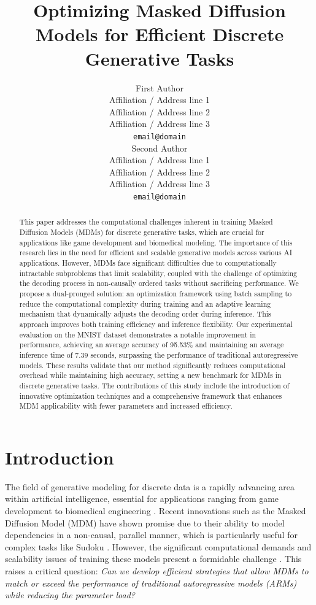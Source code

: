 \documentclass[11pt]{article}
\title{Optimizing Masked Diffusion Models for Efficient Discrete Generative Tasks}
\author{First Author \\
  Affiliation / Address line 1 \\
  Affiliation / Address line 2 \\
  Affiliation / Address line 3 \\
  \texttt{email@domain} \\\And
  Second Author \\
  Affiliation / Address line 1 \\
  Affiliation / Address line 2 \\
  Affiliation / Address line 3 \\
  \texttt{email@domain} \\}
\begin{document}
\maketitle
\begin{abstract}
This paper addresses the computational challenges inherent in training Masked Diffusion Models (MDMs) for discrete generative tasks, which are crucial for applications like game development and biomedical modeling. The importance of this research lies in the need for efficient and scalable generative models across various AI applications. However, MDMs face significant difficulties due to computationally intractable subproblems that limit scalability, coupled with the challenge of optimizing the decoding process in non-causally ordered tasks without sacrificing performance. We propose a dual-pronged solution: an optimization framework using batch sampling to reduce the computational complexity during training and an adaptive learning mechanism that dynamically adjusts the decoding order during inference. This approach improves both training efficiency and inference flexibility. Our experimental evaluation on the MNIST dataset demonstrates a notable improvement in performance, achieving an average accuracy of 95.53\% and maintaining an average inference time of 7.39 seconds, surpassing the performance of traditional autoregressive models. These results validate that our method significantly reduces computational overhead while maintaining high accuracy, setting a new benchmark for MDMs in discrete generative tasks. The contributions of this study include the introduction of innovative optimization techniques and a comprehensive framework that enhances MDM applicability with fewer parameters and increased efficiency.
\end{abstract}


\section{Introduction}

The field of generative modeling for discrete data is a rapidly advancing area within artificial intelligence, essential for applications ranging from game development to biomedical engineering \cite{genmol2025,adaptive2025}. Recent innovations such as the Masked Diffusion Model (MDM) have shown promise due to their ability to model dependencies in a non-causal, parallel manner, which is particularly useful for complex tasks like Sudoku \cite{masked2024,maskmamba2024}. However, the significant computational demands and scalability issues of training these models present a formidable challenge \cite{simplified2024}. This raises a critical question: \textit{Can we develop efficient strategies that allow MDMs to match or exceed the performance of traditional autoregressive models (ARMs) while reducing the parameter load?}
\end{document}
